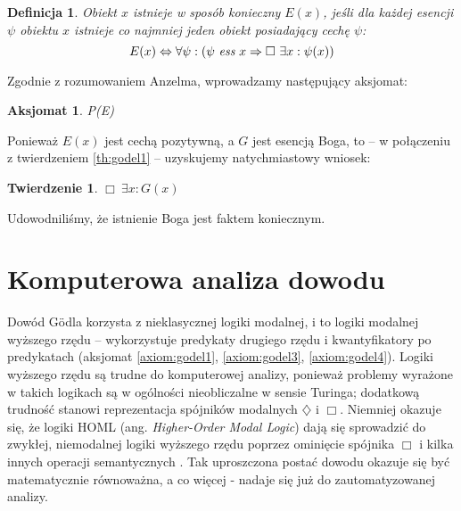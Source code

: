 \documentclass[runningheads]{llncs}
\newtheorem{theorem-pl}{Twierdzenie}
\newtheorem{definition-pl}{Definicja}
\newtheorem{axiom-pl}{Aksjomat}
\begin{document}
\begin{definition-pl} \label{def:godel-existence}
	Obiekt $x$ istnieje w sposób konieczny $E(x)$, jeśli dla każdej esencji $\psi$ obiektu $x$ istnieje co najmniej jeden obiekt posiadający cechę $\psi$:
	\begin{equation*}
	E(x) \Leftrightarrow \forall \psi: \left( \psi\ \emph{ess}\ x \Rightarrow\Box\ \exists x: \psi(x) \right)
	\end{equation*}
\end{definition-pl}
\noindent Zgodnie z rozumowaniem Anzelma, wprowadzamy następujący aksjomat:
\begin{axiom-pl} \label{axiom:godel5}
	P(E)
\end{axiom-pl}
\noindent Ponieważ $E(x)$ jest cechą pozytywną, a $G$ jest esencją Boga, to -- w połączeniu z twierdzeniem \ref{th:godel1} -- uzyskujemy natychmiastowy wniosek:
\begin{theorem-pl} \label{th:godel-god}
	$\Box\ \exists x: G(x)$
\end{theorem-pl}
\noindent Udowodniliśmy, że istnienie Boga jest faktem koniecznym.

\section{Komputerowa analiza dowodu}
Dowód G\"odla korzysta z nieklasycznej logiki modalnej, i to logiki modalnej wyższego rzędu -- wykorzystuje predykaty drugiego rzędu i kwantyfikatory po predykatach (aksjomat \ref{axiom:godel1}, \ref{axiom:godel3}, \ref{axiom:godel4}). Logiki wyższego rzędu są trudne do komputerowej analizy, ponieważ problemy wyrażone w takich logikach są w ogólności nieobliczalne w sensie Turinga; dodatkową trudność stanowi reprezentacja spójników modalnych $\diamondsuit$ i $\Box$. Niemniej okazuje się, że logiki HOML (ang. \textit{Higher-Order Modal Logic}) dają się sprowadzić do zwykłej, niemodalnej logiki wyższego rzędu poprzez ominięcie spójnika $\Box$ i kilka innych operacji semantycznych \cite{benzmuller2014}. Tak uproszczona postać dowodu okazuje się być matematycznie równoważna, a co więcej - nadaje się już do zautomatyzowanej analizy. 
\end{document}
